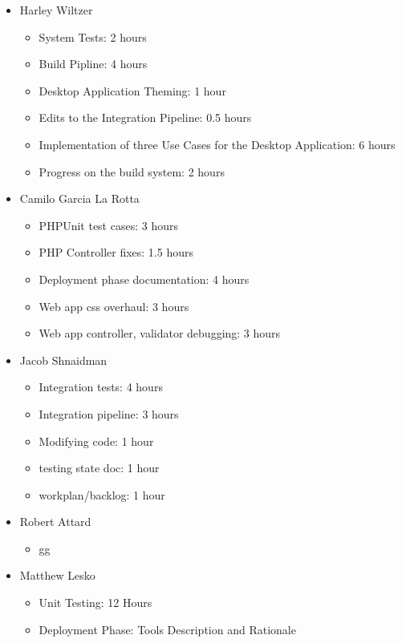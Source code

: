 \documentclass[12pt]{article}
\begin{document}
 \begin{itemize}
     \item Harley Wiltzer
        \begin{itemize}
            \item System Tests: 2 hours
            \item Build Pipline: 4 hours
            \item Desktop Application Theming: 1 hour
            \item Edits to the Integration Pipeline: 0.5 hours
            \item Implementation of three Use Cases for the Desktop Application: 6 hours
            \item Progress on the build system: 2 hours
        \end{itemize}
     \item Camilo Garcia La Rotta
     \begin{itemize}
         \item PHPUnit test cases: 3 hours
         \item PHP Controller fixes: 1.5 hours
         \item Deployment phase documentation: 4 hours
         \item Web app css overhaul: 3 hours
         \item Web app controller, validator debugging: 3 hours
     \end{itemize}
     \item Jacob Shnaidman
     \begin{itemize}
         \item Integration tests: 4 hours
         \item Integration pipeline: 3 hours
         \item Modifying code: 1 hour
         \item testing state doc: 1 hour
         \item workplan/backlog: 1 hour
     \end{itemize}
     \item Robert Attard
     \begin{itemize}
         \item gg
     \end{itemize}
     \item Matthew Lesko
     \begin{itemize}
        \item Unit Testing: 12 Hours
        \item Deployment Phase: Tools Description and Rationale
     \end{itemize}
 \end{itemize}
\end{document}
